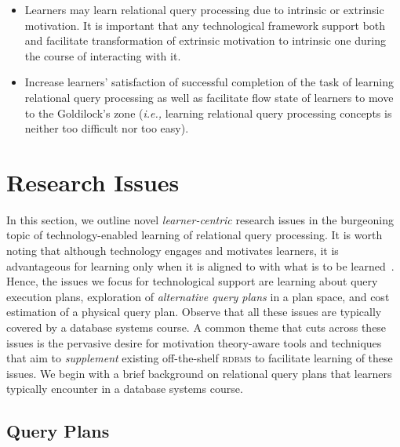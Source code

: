 \documentclass[11pt]{article}
\newcommand{\ie}{\emph{i.e.,}\xspace}
\begin{document}
\begin{itemize} \itemsep = -0.5ex

\item Learners may learn relational query processing due to intrinsic or extrinsic motivation. It is important that any technological framework support both and facilitate transformation of extrinsic motivation to intrinsic one during the course of interacting with it. 

\item  Increase learners' satisfaction of successful completion of the task of learning relational query processing as well as facilitate flow state of learners to move to the Goldilock's zone (\ie learning relational query processing concepts is neither too difficult nor too easy). 

\end{itemize}

\section{Research Issues}
\label{sec:challenge}
In this section, we outline novel \textit{learner-centric} research issues in the burgeoning topic of technology-enabled learning of relational query processing.  It is worth noting that although technology engages and motivates learners, it is advantageous for learning only when it is aligned to with what is to be learned~\cite{HXK12}. Hence, the issues we focus for technological support are learning about query execution plans, exploration of \textit{alternative query plans} in a plan space, and cost estimation of a physical query plan. Observe that all these issues are typically covered by a database systems course.  A common theme that cuts across these issues is the pervasive desire for motivation theory-aware tools and techniques that aim to \emph{supplement} existing off-the-shelf \textsc{rdbms} to facilitate learning of these issues. We begin with a brief background on relational query plans that learners typically encounter in a database systems course. 

\subsection{Query Plans}
\end{document}
